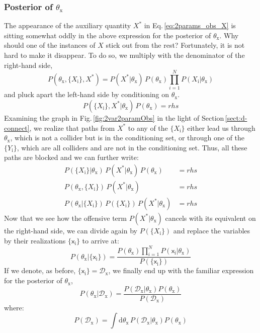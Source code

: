 \documentclass[]{report}
\begin{document}
\subsubsection{Posterior of $\theta_\mathrm{x}$}
The appearance of the auxiliary quantity $X^*$ in Eq.\,\ref{eq:2params_obs_X} is sitting somewhat oddly in the above expression for the posterior of $\theta_\mathrm{x}$. Why should one of the instances of $X$ stick out from the rest? Fortunately, it is not hard to make it disappear. To do so, we multiply with the denominator of the right-hand side,
\begin{equation}
P( \theta_\mathrm{x}, \{X_\mathrm{i}\}, X^* ) 
=
P( X^* | \theta_\mathrm{x} ) \,
P( \theta_\mathrm{x} )
\prod_{i=1}^{N}
	P (X_\mathrm{i} | \theta_\mathrm{x} )
\end{equation}
and pluck apart the left-hand side by conditioning on $\theta_\mathrm{x}$.
\begin{equation}
P( \{X_\mathrm{i}\}, X^* | \theta_\mathrm{x} ) \,
P( \theta_\mathrm{x} )
= 
rhs
\end{equation}
Examining the graph in Fig.\,\ref{fig:2var2paramObs} in the light of Section\,\ref{sect:d-connect}, we realize that paths from $X^*$ to any of the $ \{ X_\mathrm{i} \} $ either lead us through $\theta_\mathrm{x}$, which is not a collider but is in the conditioning set, or through one of the $\{Y_\mathrm{i}\}$, which are all colliders and are not in the conditioning set. Thus, all these paths are blocked and we can further write:  
\begin{align}
P( \{X_\mathrm{i}\} | \theta_\mathrm{x} ) \,
P( X^* | \theta_\mathrm{x} ) \,
P( \theta_\mathrm{x} )
&=
rhs
\nonumber \\
P( \theta_\mathrm{x}, \{X_\mathrm{i}\} ) \,
P( X^* | \theta_\mathrm{x} )
&= 
rhs
\\
P( \theta_\mathrm{x} | \{X_\mathrm{i}\} ) \,
P( \{X_\mathrm{i}\} ) \,
P( X^* | \theta_\mathrm{x} )
&= 
rhs
\nonumber
\end{align}
Now that we see how the offensive term $P( X^* | \theta_\mathrm{x} ) $ cancels with its equivalent on the right-hand side, we can divide again by $P( \{X_\mathrm{i}\} ) $ and replace the variables by their realizations $ \{ \mathsf{x}_\mathrm{i} \} $ to arrive at:
\begin{equation}
P( \theta_\mathrm{x} | \{ \mathsf{x}_\mathrm{i} \} ) 
=
\frac
	{
		P( \theta_\mathrm{x} )
		\prod_{i=1}^{N}
			P( \mathsf{x}_\mathrm{i} | \theta_\mathrm{x} )
	}
	{
		P( \{ \mathsf{x}_\mathrm{i} \} )
	} 
\end{equation}
If we denote, as before, $ \{ \mathsf{x}_\mathrm{i} \} = \mathcal{D}_\mathrm{x}$, we finally end up with the familiar expression for the posterior of $\theta_\mathrm{x}$,
\begin{equation}
P( \theta_\mathrm{x} | \mathcal{D}_\mathrm{x} ) 
= 
\frac
	{
		P( \mathcal{D}_\mathrm{x} | \theta_\mathrm{x} )
		P( \theta_\mathrm{x} )
	}
	{
		P( \mathcal{D}_\mathrm{x} )
	} 
\end{equation}
where:
\begin{equation}
P( \mathcal{D}_\mathrm{x} )
=
\int \mathrm{d}\theta_\mathrm{x} \,
	P( \mathcal{D}_\mathrm{x} | \theta_\mathrm{x} )
	P( \theta_\mathrm{x} )
\end{equation}
\end{document}
